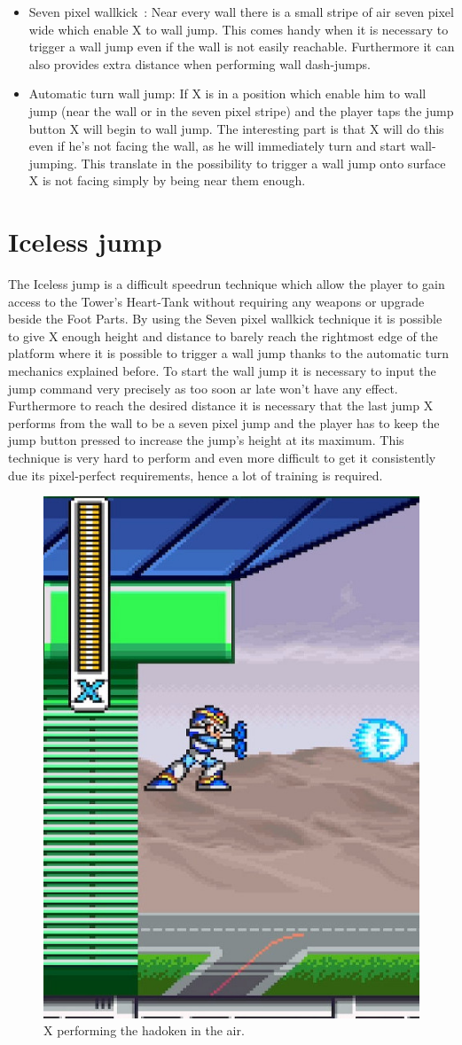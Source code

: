 \begin{itemize}
	\item Seven pixel wallkick~\cite{MMX_RTA_wiki:basics}: Near every wall there is a small stripe of air seven pixel wide which enable X to wall jump. This comes handy when it is necessary to trigger a wall jump even if the wall is not easily reachable. Furthermore it can also provides extra distance when performing wall dash-jumps.
	
	\item Automatic turn wall jump: If X is in a position which enable him to wall jump (near the wall or in the seven pixel stripe) and the player taps the jump button X will begin to wall jump. The interesting part is that X will do this even if he's not facing the wall, as he will immediately turn and start wall-jumping. This translate in the possibility to trigger a wall jump onto surface X is not facing simply by being near them enough.
\end{itemize}

\section{Iceless jump}\label{misc:iceless}
The Iceless jump is a difficult speedrun technique which allow the player to gain access to the Tower's Heart-Tank without requiring any weapons or upgrade beside the Foot Parts. By using the Seven pixel wallkick technique it is possible to give X enough height and distance to barely reach the rightmost edge of the platform where it is possible to trigger a wall jump thanks to the automatic turn mechanics explained before. To start the wall jump it is necessary to input the jump command very precisely as too soon ar late won't have any effect. Furthermore to reach the desired distance it is necessary that the last jump X performs from the wall to be a seven pixel jump and the player has to keep the jump button pressed to increase the jump's height at its maximum. 
This technique is very hard to perform and even more difficult to get it consistently due its pixel-perfect requirements, hence a lot of training is required.

\begin{figure}[htp]
	\centering
	\includegraphics[width=0.4\linewidth]{figures/X1/Miscs/Flying_hadoken.jpg}
	\caption{X performing the hadoken in the air.}
\end{figure}
